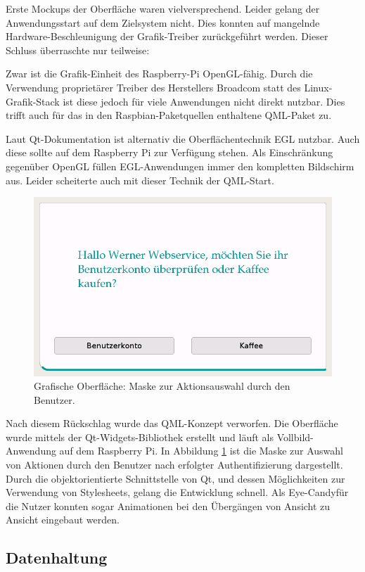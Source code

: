 \documentclass[11pt,a4paper]{IEEEtran}
\begin{document}
Erste Mockups der Oberfläche waren vielversprechend. Leider gelang der 
Anwendungsstart auf dem Zielsystem nicht. Dies konnten auf mangelnde 
Hardware-Beschleunigung der Grafik-Treiber zurückgeführt werden. Dieser Schluss
überraschte nur teilweise: 

Zwar ist die Grafik-Einheit des Raspberry-Pi OpenGL-fähig. Durch die Verwendung
proprietärer Treiber des Herstellers Broadcom statt des Linux-Grafik-Stack ist
diese jedoch für viele Anwendungen nicht direkt nutzbar. Dies trifft auch für
das in den Raspbian-Paketquellen enthaltene QML-Paket zu.

Laut Qt-Dokumentation ist alternativ die Oberflächentechnik EGL nutzbar. Auch
diese sollte auf dem Raspberry Pi zur Verfügung stehen. Als Einschränkung 
gegenüber OpenGL füllen EGL-Anwendungen immer den kompletten Bildschirm aus.
Leider scheiterte auch mit dieser Technik der QML-Start.

\begin{figure}[htb]
    \label{fig:qt}
    \centering
    \includegraphics[width=.9\columnwidth]{images/screenshot}
    \caption{Grafische Oberfläche: Maske zur Aktionsauswahl durch den Benutzer.}
\end{figure}

Nach diesem Rückschlag wurde das QML-Konzept verworfen. Die Oberfläche wurde
mittels der Qt-Widgets-Bibliothek erstellt und läuft als Vollbild-Anwendung 
auf dem Raspberry Pi. In Abbildung \ref{fig:qt} ist die Maske zur Auswahl von
Aktionen durch den Benutzer nach erfolgter Authentifizierung dargestellt. Durch
die objektorientierte Schnittstelle von Qt, und dessen Möglichkeiten zur
Verwendung von Stylesheets, gelang die Entwicklung schnell. Als 
\glqq Eye-Candy\grqq{ }für die Nutzer konnten sogar Animationen bei den Übergängen von Ansicht
zu Ansicht eingebaut werden.

\subsection{Datenhaltung}
\end{document}
